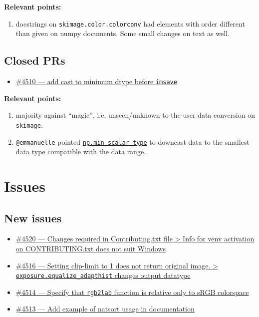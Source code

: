 \documentclass[11pt]{article}
\begin{document}
\textbf{Relevant points:}
\begin{enumerate}
\item docstrings on \texttt{skimage.color.colorconv} had elements with order
different than given on numpy documents. Some small changes on text
as well.
\end{enumerate}


\subsection{Closed PRs}
\label{sec:orgd57ca1e}

\begin{itemize}
\item \href{https://github.com/scikit-image/scikit-image/pull/4510}{\#4510 — add cast to minimum dtype before \texttt{imsave}}
\end{itemize}

\textbf{Relevant points:}
\begin{enumerate}
\item majority against ``magic'', i.e. unseen/unknown-to-the-user data
conversion on \texttt{skimage}.
\item \texttt{@emmanuelle} pointed \href{https://docs.scipy.org/doc/numpy/reference/generated/numpy.min\_scalar\_type.html?highlight=min\_scalar\_type\#numpy.min\_scalar\_type}{\texttt{np.min\_scalar\_type}} to downcast data to
the smallest data type compatible with the data range.
\end{enumerate}


\section{Issues}
\label{sec:orgcfb9810}

\subsection{New issues}
\label{sec:org6905c17}

\begin{itemize}
\item \href{https://github.com/scikit-image/scikit-image/issues/4520}{\#4520 — Changes required in Contributing.txt file > Info for venv activation on CONTRIBUTING.txt does not suit Windows}

\item \href{https://github.com/scikit-image/scikit-image/issues/4516}{\#4516 — Setting clip-limit to 1 does not return original image. > \texttt{exposure.equalize\_adapthist} changes output datatype}

\item \href{https://github.com/scikit-image/scikit-image/issues/4514}{\#4514 — Specify that \texttt{rgb2lab} function is relative only to sRGB colorspace}

\item \href{https://github.com/scikit-image/scikit-image/issues/4513}{\#4513 — Add example of natsort usage in documentation}
\end{itemize}
\end{document}
